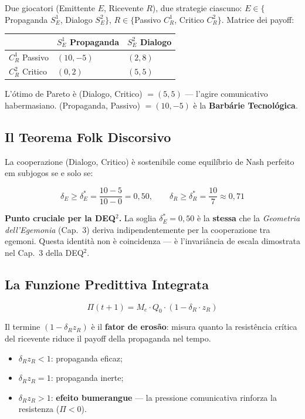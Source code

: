 Due giocatori (Emittente \(E\), Ricevente \(R\)), due strategie
ciascuno: \(E \in \{\)Propaganda \(S^1_E\), Dialogo \(S^2_E\}\),
\(R \in \{\)Passivo \(C^1_R\), Critico \(C^2_R\}\). Matrice dei payoff:

{\def\LTcaptype{none} %
{\small\begin{longtable}[]{@{}lll@{}}
\toprule\noalign{}
& \(S^1_E\) Propaganda & \(S^2_E\) Dialogo \\
\midrule\noalign{}
\endhead
\bottomrule\noalign{}
\endlastfoot
\(C^1_R\) Passivo & \((10, -5)\) & \((2, 8)\) \\
\(C^2_R\) Critico & \((0, 2)\) & \((5, 5)\) \\
\end{longtable}}
}

L'ótimo de Pareto è (Dialogo, Critico) \(= (5, 5)\) --- l'agire
comunicativo habermasiano. (Propaganda, Passivo) \(= (10, -5)\) è la
\textbf{Barbárie Tecnológica}.

\subsection{Il Teorema Folk
Discorsivo}\label{il-folk-theorem-discorsivo}

\Proved{} La cooperazione (Dialogo, Critico) è sostenibile come
equilíbrio de Nash perfeito em subjogos se e solo se:

\[
\delta_E \geq \delta^*_E = \frac{10 - 5}{10 - 0} = 0{,}50, \qquad \delta_R \geq \delta^*_R = \frac{10}{7} \approx 0{,}71
\]

\Hypoth{} \textbf{Punto cruciale per la DEQ$^2$.} La soglia
\(\delta^*_E = 0{,}50\) è la \textbf{stessa} che la \emph{Geometria
dell'Egemonia} (Cap.~3) deriva indipendentemente per la cooperazione tra
egemoni. Questa identità non è coincidenza --- è l'invariância de escala
dimostrata nel Cap.~3 della DEQ$^2$.

\subsection{La Funzione Predittiva
Integrata}\label{la-funzione-predittiva-integrata}

\[
\boxed{\Pi(t+1) = M_e \cdot Q_0 \cdot (1 - \delta_R \cdot z_R)}
\]

Il termine \((1 - \delta_R z_R)\) è il \textbf{fator de erosão}:
misura quanto la resistência crítica del ricevente riduce il payoff della
propaganda nel tempo.

\begin{itemize}
\tightlist
\item
  \(\delta_R z_R < 1\): propaganda eficaz;
\item
  \(\delta_R z_R = 1\): propaganda inerte;
\item
  \(\delta_R z_R > 1\): \textbf{efeito bumerangue} --- la pressione
  comunicativa rinforza la resistenza (\(\Pi < 0\)).
\end{itemize}

